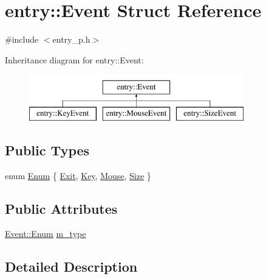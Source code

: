 \hypertarget{structentry_1_1_event}{\section{entry\+:\+:Event Struct Reference}
\label{structentry_1_1_event}
}


{\ttfamily \#include $<$entry\+\_\+p.\+h$>$}

Inheritance diagram for entry\+:\+:Event\+:\begin{figure}[H]
\begin{center}
\leavevmode
\includegraphics[height=2.000000cm]{structentry_1_1_event}
\end{center}
\end{figure}
\subsection*{Public Types}
\begin{DoxyCompactItemize}
\item 
enum \hyperlink{structentry_1_1_event_a64a52da43ae1e2fb4ee9eb593383882e}{Enum} \{ \hyperlink{structentry_1_1_event_a64a52da43ae1e2fb4ee9eb593383882ea118ce6190eba05e5440d3d7d7512f315}{Exit}, 
\hyperlink{structentry_1_1_event_a64a52da43ae1e2fb4ee9eb593383882eabfda222f9e908227f1357020067dadd5}{Key}, 
\hyperlink{structentry_1_1_event_a64a52da43ae1e2fb4ee9eb593383882ea2ff8dc10077f8307c2337ad87e3d1bf9}{Mouse}, 
\hyperlink{structentry_1_1_event_a64a52da43ae1e2fb4ee9eb593383882eab96cd0d2f94741362139b640d9feb4c2}{Size}
 \}
\end{DoxyCompactItemize}
\subsection*{Public Attributes}
\begin{DoxyCompactItemize}
\item 
\hyperlink{structentry_1_1_event_a64a52da43ae1e2fb4ee9eb593383882e}{Event\+::\+Enum} \hyperlink{structentry_1_1_event_a1b1605fe09ef2a4cd5e49be227776700}{m\+\_\+type}
\end{DoxyCompactItemize}


\subsection{Detailed Description}


